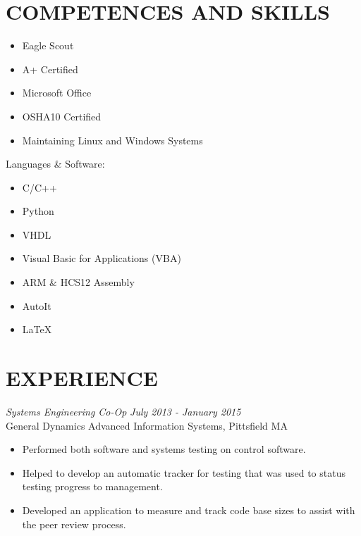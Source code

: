 \documentclass[line,margin]{res}
\begin{document}
\begin{resume}
\section{COMPETENCES AND SKILLS} 
		\begin{multicols}{2}
			\begin{itemize}
				\itemsep -2pt
				\item[] Eagle Scout
				\item[] A+ Certified
				\item[] Microsoft Office
				\item[] OSHA10 Certified
				\item[] Maintaining Linux and Windows Systems
			\end{itemize}
		\end{multicols}
	{Languages \& Software:} %
		\begin{multicols}{2}
			\begin{itemize}
				\itemsep -2pt
				\item[] C/C++
				\item[] Python
				\item[] VHDL
				\item[] Visual Basic for Applications (VBA)
				\item[] ARM \& HCS12 Assembly
				\item[] AutoIt
				\item[] \LaTeX 
			\end{itemize}
		\end{multicols}
\section{EXPERIENCE} 
{\sl Systems Engineering Co-Op} \hfill {\sl July 2013 - January 2015 }\\
	General Dynamics Advanced Information Systems, Pittsfield MA
	\begin{itemize}  \itemsep -2pt %
			\item Performed both software and systems testing on 
				control software. 
			\item Helped to develop an automatic tracker for
				testing that was used to status testing progress
				to management. 
			\item Developed an application to measure and track 
				code base sizes to assist with the peer review process.
	\end{itemize}
 

\end{resume}
\end{document}
